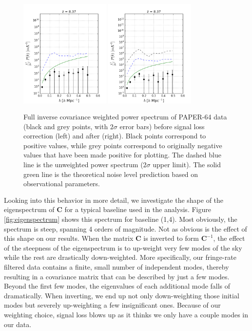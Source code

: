 \documentclass[preprint2,numberedappendix,tighten,twocolappendix]{aastex6}  %
\begin{document}
\begin{figure}
	\centering
	\includegraphics[width=0.4\textwidth]{plots/ps2_data_nosigloss.png}
	\includegraphics[width=0.4\textwidth]{plots/ps2_data.png}
	\caption{Full inverse covariance weighted power spectrum of PAPER-64 data (black and grey points, with $2\sigma$ error bars) before signal loss correction (left) and after (right). Black points correspond to positive values, while grey points correspond to originally negative values that have been made positive for plotting. The dashed blue line is the unweighted power spectrum ($2\sigma$ upper limit). The solid green line is the theoretical noise level prediction based on observational parameters.}
	\label{fig:ps2_data}
\end{figure}

Looking into this behavior in more detail, we investigate the shape of the eigenspectrum of $\textbf{C}$ for a typical baseline used in the analysis. Figure \ref{fig:eigenspectrum} shows this spectrum for baseline (1,4). Most obviously, the spectrum is steep, spanning 4 orders of magnitude. Not as obvious is the effect of this shape on our results. When the matrix $\textbf{C}$ is inverted to form $\textbf{C}^{-1}$, the effect of the steepness of the eigenspectrum is to up-weight very few modes of the sky while the rest are drastically down-weighted. More specifically, our fringe-rate filtered data contains a finite, small number of independent modes, thereby resulting in a covariance matrix that can be described by just a few modes. Beyond the first few modes, the eigenvalues of each additional mode falls of dramatically. When inverting, we end up not only down-weighting those initial modes but severely up-weighting a few insignificant ones. Because of our weighting choice, signal loss blows up as it thinks we only have a couple modes in our data.
\end{document}
